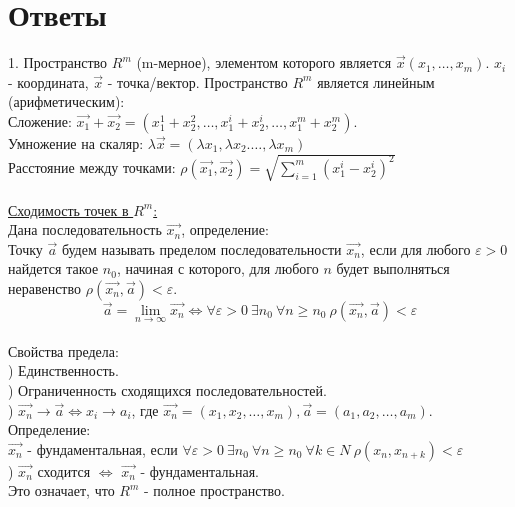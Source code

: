 \documentclass[12pt]{article}
\begin{document}
\section{Ответы}
\label{question1_1}1. Пространство $R^m$ (m-мерное), элементом которого является $\overrightarrow{x}(x_1,\dots,x_m)$. $x_i$ - координата, $\vec{x}$ - точка/вектор. Пространство $R^m$ является линейным (арифметическим):\\
\indent Сложение: $\overrightarrow{x_1} + \overrightarrow{x_2} = (x_1^1 + x_2^2,\dots, x_1^i + x_2^i,\dots,x_1^m + x_2^m)$.\\
\indent Умножение на скаляр: $\lambda \vec{x} = (\lambda x_1, \lambda x_2. \dots, \lambda x_m)$\\
\indent Расстояние между точками: $\rho (\vec{x_1}, \vec{x_2}) = \sqrt{\sum_{i=1}^{m} (x_1^i-x_2^i)^2} $\\
\\
\label{question1_3}\underline{Сходимость точек в $R^m$:}\\
Дана последовательность $\overrightarrow{x_n}$, определение:\\
Точку $\overrightarrow{a}$ будем называть пределом последовательности $\vec{x_n}$, если для любого $\varepsilon > 0$ найдется такое $n_0$, начиная с которого, для любого $n$ будет выполняться неравенство $\rho (\overrightarrow{x_n}, \overrightarrow{a}) < \varepsilon$.\\
$$\overrightarrow{a}=\lim_{n\to\infty} \overrightarrow{x_n} \iff \forall \varepsilon>0 \ \exists n_0 \ \forall n \geq n_0 \ \rho (\overrightarrow{x_n}, \overrightarrow{a}) < \varepsilon$$\\
Свойства предела:\\
) Единственность.\\
) Ограниченность сходящихся последовательностей.\\
) $\overrightarrow{x_n} \rightarrow \overrightarrow{a} \iff x_i \rightarrow a_i$, где $\overrightarrow{x_n} = (x_1,x_2,\dots,x_m), \overrightarrow{a} = (a_1,a_2,\dots,a_m)$.\\
Определение: \\
\indent $\overrightarrow{x_n}$ - фундаментальная, если $\forall \varepsilon > 0 \ \exists n_0 \ \forall n \geq n_0 \ \forall k \in N \ \rho (x_n, x_{n+k}) < \varepsilon$\\
) $\overrightarrow{x_n}$ сходится $\iff$ $\overrightarrow{x_n}$ - фундаментальная.\\
Это означает, что $R^m$ - полное пространство.\\
\end{document}
